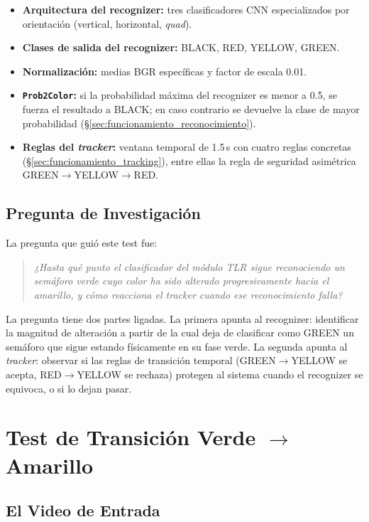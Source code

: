 \begin{itemize}
    \item \textbf{Arquitectura del recognizer:} tres clasificadores CNN especializados por orientación (vertical, horizontal, \textit{quad}).
    \item \textbf{Clases de salida del recognizer:} BLACK, RED, YELLOW, GREEN.
    \item \textbf{Normalización:} medias BGR específicas y factor de escala 0.01.
    \item \textbf{\texttt{Prob2Color}:} si la probabilidad máxima del recognizer es menor a 0.5, se fuerza el resultado a BLACK; en caso contrario se devuelve la clase de mayor probabilidad (§\ref{sec:funcionamiento_reconocimiento}).
    \item \textbf{Reglas del \textit{tracker}:} ventana temporal de 1.5\,s con cuatro reglas concretas (§\ref{sec:funcionamiento_tracking}), entre ellas la regla de seguridad asimétrica GREEN$\to$YELLOW$\to$RED.
\end{itemize}

\subsection{Pregunta de Investigación}

La pregunta que guió este test fue:

\begin{quote}
\textit{¿Hasta qué punto el clasificador del módulo TLR sigue reconociendo un semáforo verde cuyo color ha sido alterado progresivamente hacia el amarillo, y cómo reacciona el \textit{tracker} cuando ese reconocimiento falla?}
\end{quote}

La pregunta tiene dos partes ligadas. La primera apunta al recognizer: identificar la magnitud de alteración a partir de la cual deja de clasificar como GREEN un semáforo que sigue estando físicamente en su fase verde. La segunda apunta al \textit{tracker}: observar si las reglas de transición temporal (GREEN$\to$YELLOW se acepta, RED$\to$YELLOW se rechaza) protegen al sistema cuando el recognizer se equivoca, o si lo dejan pasar.

\section{Test de Transición Verde $\to$ Amarillo}

\subsection{El Video de Entrada}
\label{sec:test_video_entrada}

